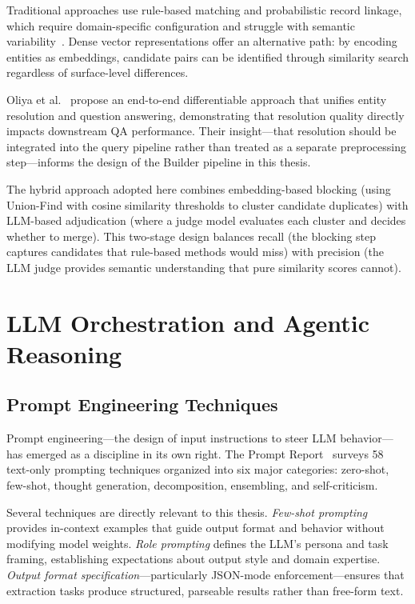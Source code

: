 Traditional approaches use rule-based matching and probabilistic record linkage, which require domain-specific configuration and struggle with semantic variability~\cite{kejriwal2023namedentityresolutionpersonal}. Dense vector representations offer an alternative path: by encoding entities as embeddings, candidate pairs can be identified through similarity search regardless of surface-level differences.

Oliya et al.~\cite{oliya2021endtoendentityresolutionquestion} propose an end-to-end differentiable approach that unifies entity resolution and question answering, demonstrating that resolution quality directly impacts downstream QA performance. Their insight---that resolution should be integrated into the query pipeline rather than treated as a separate preprocessing step---informs the design of the Builder pipeline in this thesis.

The hybrid approach adopted here combines embedding-based blocking (using Union-Find with cosine similarity thresholds to cluster candidate duplicates) with LLM-based adjudication (where a judge model evaluates each cluster and decides whether to merge). This two-stage design balances recall (the blocking step captures candidates that rule-based methods would miss) with precision (the LLM judge provides semantic understanding that pure similarity scores cannot).

\section{LLM Orchestration and Agentic Reasoning}
\label{sec:rw:agents}

\subsection{Prompt Engineering Techniques}
\label{sec:rw:prompt_engineering}

Prompt engineering---the design of input instructions to steer LLM behavior---has emerged as a discipline in its own right. The Prompt Report~\cite{schulhoff2025promptreportsystematicsurvey} surveys 58 text-only prompting techniques organized into six major categories: zero-shot, few-shot, thought generation, decomposition, ensembling, and self-criticism.

Several techniques are directly relevant to this thesis. \emph{Few-shot prompting} provides in-context examples that guide output format and behavior without modifying model weights. \emph{Role prompting} defines the LLM's persona and task framing, establishing expectations about output style and domain expertise. \emph{Output format specification}---particularly JSON-mode enforcement---ensures that extraction tasks produce structured, parseable results rather than free-form text.

